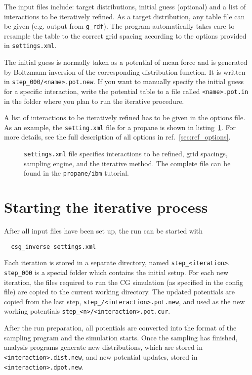 The input files include: target distributions, initial guess (optional) and a list of interactions to be iteratively refined. As a target distribution, any table file can be given (e.g. \gromacs output from \texttt{g\_rdf}). The program automatically takes care to resample the table to the correct grid spacing according to the options provided in \texttt{settings.xml}.

The initial guess is normally taken as a potential of mean force and is generated by Boltzmann-inversion of the corresponding distribution function. It is written in \texttt{step\_000/<name>.pot.new}. If you want to manually specify the initial guess for a specific interaction, write the potential table to a file called \texttt{<name>.pot.in} in the folder where you plan to run the iterative procedure.

A list of interactions to be iteratively refined has to be given in the options file. As an example, the \texttt{setting.xml} file for a propane is shown in listing~\ref{list:settings}. For more details,  see the full description of all options in ref.~\ref{sec:ref_options}.
\begin{figure}
\centering
\framebox{

}
\caption{\texttt{settings.xml} file specifies interactions to be refined, grid spacings, sampling engine, and the iterative method. The complete file can be found in the \texttt{propane/ibm} tutorial. 
\label{list:settings}
}
\end{figure}

\section{Starting the iterative process}
\label{sec:starting_iterative_process}
After all input files have been set up, the run can be started with
\begin{verbatim}
  csg_inverse settings.xml
\end{verbatim}

Each iteration is stored in a separate directory, named \texttt{step\_<iteration>}. \texttt{step\_000} is a special folder which contains the initial setup. For each new iteration, the files required to run the CG simulation (as specified in the config file) are copied to the current working directory. The updated potentials  are copied from the last step, \texttt{step\_<n-1>/<interaction>.pot.new}, and used as the new working potentials \texttt{step\_<n>/<interaction>.pot.cur}.

After the run preparation, all potentials are converted into the format of the sampling program and the simulation starts. Once the sampling has finished, analysis programs generate new distributions, which are stored in \texttt{<interaction>.dist.new}, and new potential updates, stored in \texttt{<interaction>.dpot.new}. 

